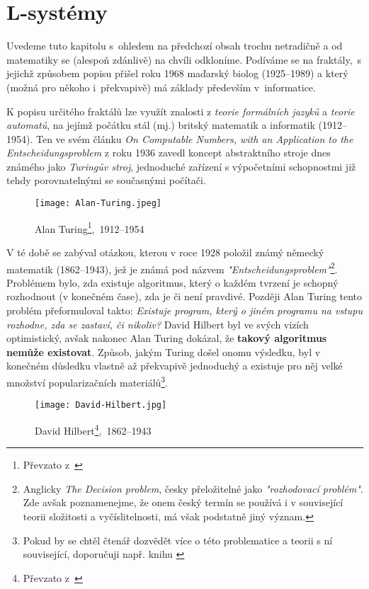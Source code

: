 \section{L-systémy}\label{sec:L-systemy}

Uvedeme tuto kapitolu s~ohledem na předchozí obsah trochu netradičně a od matematiky se (alespoň zdánlivě) na chvíli odkloníme. Podíváme se na fraktály,~s jejichž způsobem popisu přišel roku 1968 maďarský biolog  (1925--1989) a který (možná pro někoho i~překvapivě) má základy především v~informatice. \citep[str. 2]{Prusinkiewicz1990}

K popisu určitého fraktálů lze využít znalosti z \emph{teorie formálních jazyků} a \emph{teorie automatů}, na jejímž počátku stál (mj.) britský matematik a informatik  (1912--1954). Ten ve svém článku \emph{On Computable Numbers, with an Application to the Entscheidungsproblem} z roku 1936 zavedl koncept abstraktního stroje dnes známého jako \emph{Turingův stroj}, jednoduché zařízení s výpočetními schopnostmi již tehdy porovnatelnými se současnými počítači.
\begin{figure}[h]
    \centering
    \texttt{[image: Alan-Turing.jpeg]}
    \caption[Alan Turing,~1871--1956]{Alan Turing\footnote{Převzato z~\cite{OConnorTuring2025}},~1912--1954}
    \label{fig:alan-turing}
\end{figure}
V té době se zabýval otázkou, kterou v roce 1928 položil známý německý matematik  (1862--1943), jež je známá pod názvem \emph{"Entscheidungsproblem"}\footnote{Anglicky \emph{The Decision problem}, česky přeložitelné jako \emph{"rozhodovací problém"}. Zde avšak poznamenejme, že onem český termín se používá i v související teorii složitosti a vyčíslitelnosti, má však podstatně jiný význam.}. Problémem bylo, zda existuje algoritmus, který o každém tvrzení je schopný rozhodnout (v konečném čase), zda je či není pravdivé. Později Alan Turing tento problém přeformuloval takto: \emph{Existuje program, který o jiném programu na vstupu rozhodne, zda se zastaví, či nikoliv?} David Hilbert byl ve svých vizích optimistický, avšak nakonec Alan Turing dokázal, že \textbf{takový algoritmus nemůže existovat}. Způsob, jakým Turing došel onomu výsledku, byl v konečném důsledku vlastně až překvapivě jednoduchý a existuje pro něj velké množství popularizačních materiálů\footnote{Pokud by se chtěl čtenář dozvědět více o této problematice a teorii s ní související, doporučuji např. knihu \cite{Motwani2003}}.
\begin{figure}[h]
    \centering
    \texttt{[image: David-Hilbert.jpg]}
    \caption[David Hilbert,~1871--1956]{David Hilbert\footnote{Převzato z~\cite{OConnorHilbert2025}},~1862--1943}
    \label{fig:david-hilbert}
\end{figure}
